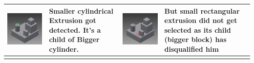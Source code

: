 \begin{longtable}{ | C{0.25\textwidth}  L{0.25\textwidth} || C{0.25\textwidth}  L{0.25\textwidth}|}
\includegraphics[scale=0.236]{..//Common/images//defeat7.png} &
Smaller cylindrical Extrusion got detected. It’s a child of Bigger cylinder.  & 
\includegraphics[scale=0.236]{..//Common/images//defeat8.png} & 
But small rectangular extrusion did not get selected as its child (bigger block) has disqualified him\\
\hline

\label{DefeatTestcases}
\end{longtable}


